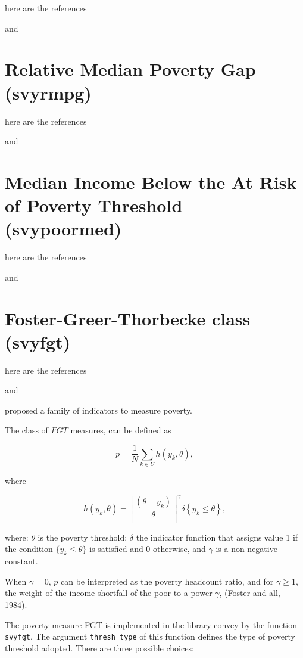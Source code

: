 \documentclass[]{book}
\begin{document}
here are the references

\citep{osier2009} and \citep{deville1999}

\section{Relative Median Poverty Gap
(svyrmpg)}\label{relative-median-poverty-gap-svyrmpg}

here are the references

\citep{osier2009} and \citep{deville1999}

\section{Median Income Below the At Risk of Poverty Threshold
(svypoormed)}\label{median-income-below-the-at-risk-of-poverty-threshold-svypoormed}

here are the references

\citep{osier2009} and \citep{deville1999}

\section{Foster-Greer-Thorbecke class
(svyfgt)}\label{foster-greer-thorbecke-class-svyfgt}

here are the references

\citep{foster1984} and \citep{berger2003}

\citep{foster1984} proposed a family of indicators to measure poverty.

The class of \(FGT\) measures, can be defined as

\[
p=\frac{1}{N}\sum_{k\in U}h(y_{k},\theta ), 
\]

where

\[
h(y_{k},\theta )=\left[ \frac{(\theta -y_{k})}{\theta }\right] ^{\gamma
}\delta \left\{ y_{k}\leq \theta \right\} , 
\]

where: \(\theta\) is the poverty threshold; \(\delta\) the indicator
function that assigns value 1 if the condition \(\{y_{k}\leq \theta \}\)
is satisfied and 0 otherwise, and \(\gamma\) is a non-negative constant.

When \(\gamma =0\), \(p\) can be interpreted as the poverty headcount
ratio, and for \(\gamma \geq 1\), the weight of the income shortfall of
the poor to a power \(\gamma\), (Foster and all, 1984).

The poverty measure FGT is implemented in the library convey by the
function \texttt{svyfgt}. The argument \texttt{thresh\_type} of this
function defines the type of poverty threshold adopted. There are three
possible choices:
\end{document}
